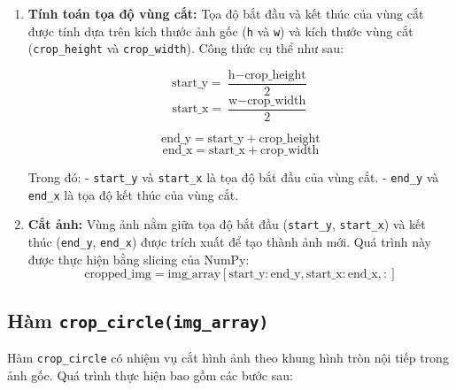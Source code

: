 \begin{enumerate}

	\item \textbf{Tính toán tọa độ vùng cắt:}
	      Tọa độ bắt đầu và kết thúc của vùng cắt được tính dựa trên kích thước ảnh gốc (\texttt{h} và \texttt{w}) và kích thước vùng cắt (\texttt{crop\_height} và \texttt{crop\_width}). Công thức cụ thể như sau:

	      \[
		      \text{start\_y} = \frac{\text{h} - \text{crop\_height}}{2}
	      \]
	      \[
		      \text{start\_x} = \frac{\text{w} - \text{crop\_width}}{2}
	      \]

	      \[
		      \text{end\_y} = \text{start\_y} + \text{crop\_height}
	      \]
	      \[
		      \text{end\_x} = \text{start\_x} + \text{crop\_width}
	      \]

	      Trong đó:
	      - \texttt{start\_y} và \texttt{start\_x} là tọa độ bắt đầu của vùng cắt.
	      - \texttt{end\_y} và \texttt{end\_x} là tọa độ kết thúc của vùng cắt.

	\item \textbf{Cắt ảnh:}
	      Vùng ảnh nằm giữa tọa độ bắt đầu (\texttt{start\_y}, \texttt{start\_x}) và kết thúc (\texttt{end\_y}, \texttt{end\_x}) được trích xuất để tạo thành ảnh mới. Quá trình này được thực hiện bằng slicing của NumPy:
	      \[
		      \text{cropped\_img} = \text{img\_array}[\text{start\_y}:\text{end\_y}, \text{start\_x}:\text{end\_x}, :]
	      \]

\end{enumerate}

\subsection{Hàm \texttt{crop\_circle(img\_array)}}
Hàm \texttt{crop\_circle} có nhiệm vụ cắt hình ảnh theo khung hình tròn nội tiếp trong ảnh gốc. Quá trình thực hiện bao gồm các bước sau:

